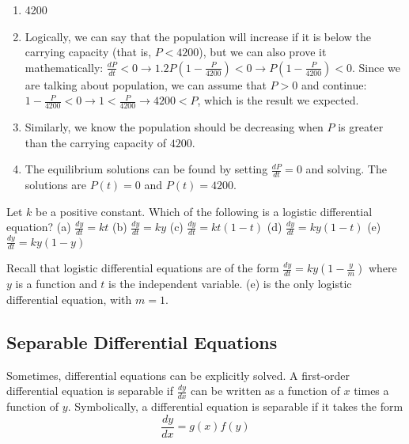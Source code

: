 \begin{Answer}[ref = logdiff1]
\begin{enumerate}
\item 4200
\item Logically, we can say that the population will increase if it is below 
the carrying capacity (that is, $P < 4200$), but we can also prove it 
mathematically: $\frac{dP}{dt} < 0 \rightarrow 1.2P \left( 1 - \frac{P}{4200} 
\right) < 0 \rightarrow P \left( 1 - \frac{P}{4200} \right) < 0$. Since we are 
talking about population, we can assume that $P > 0$ and continue: $1 - 
\frac{P}{4200} < 0 \rightarrow 1 < \frac{P}{4200} \rightarrow 4200 < P$, which 
is the result we expected. 
\item Similarly, we know the population should be decreasing when $P$ is 
greater than the carrying capacity of $4200$.
\item The equilibrium solutions can be found by setting $\frac{dP}{dt} = 0$ 
and solving. The solutions are $P(t) = 0$ and $P(t) = 4200$. 
\end{enumerate}
\end{Answer}

\begin{Exercise} Let $k$ be a positive constant. 
Which of the following is a logistic differential equation?
(a) $\frac{dy}{dt} = kt$
(b) $\frac{dy}{dt} = ky$
(c) $\frac{dy}{dt} = kt(1 - t)$
(d) $\frac{dy}{dt} = ky(1 - t)$
(e) $\frac{dy}{dt} = ky(1 - y)$
\end{Exercise}

\begin{Answer}[ref = logdiff2]
Recall that logistic differential equations are of the form $\frac{dy}{dt} = 
ky(1 - \frac{y}{m})$ where $y$ is a function and $t$ is the independent 
variable. (e) is the only logistic differential equation, with $m = 1$. 
\end{Answer}


\subsection{Separable Differential Equations}
Sometimes, differential equations can be explicitly solved. A 
first-order differential equation is separable if $\frac{dy}{dx}$ can 
be written as a function of $x$ times a function of $y$. Symbolically, 
a differential equation is separable if it takes the form 
$$\frac{dy}{dx} = g(x)f(y)$$

